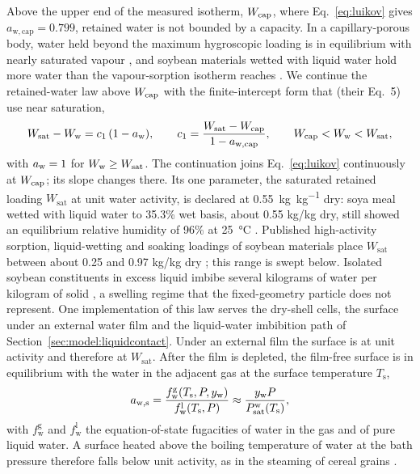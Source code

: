 Above the upper end of the measured isotherm, $W_{\mathrm{cap}}$, where
Eq.~\eqref{eq:luikov} gives $a_{\mathrm{w,cap}}=0.799$, retained water is
not bounded by a capacity. In a capillary-porous body, water held beyond
the maximum hygroscopic loading is in equilibrium with nearly saturated
vapour \citep{luikov1975systems,chen1989mathematical,schlunder2004drying,perre2023stateoftheart},
and soybean materials wetted with liquid water hold more water than the
vapour-sorption isotherm reaches
\citep{pixton1975moisture,urbanski1983flow,mukherjee2019soaking}. We
continue the retained-water law above $W_{\mathrm{cap}}$ with the finite-intercept
form that \citet{horrobin2003understanding} (their Eq.~5) use near
saturation,
\begin{equation}
W_{\mathrm{sat}}-W_{\mathrm{w}}=c_{1}\,(1-a_{\mathrm{w}}),
\qquad
c_{1}=\frac{W_{\mathrm{sat}}-W_{\mathrm{cap}}}{1-a_{\mathrm{w,cap}}},
\qquad W_{\mathrm{cap}}<W_{\mathrm{w}}<W_{\mathrm{sat}},
\label{eq:waterbridge}
\end{equation}
with $a_{\mathrm{w}}=1$ for $W_{\mathrm{w}}\ge W_{\mathrm{sat}}$. The
continuation joins Eq.~\eqref{eq:luikov} continuously at $W_{\mathrm{cap}}$; its slope
changes there. Its one parameter, the saturated retained loading
$W_{\mathrm{sat}}$ at unit water activity, is declared at
\SI{0.55}{\kilogram\per\kilogram} dry: soya meal wetted with liquid water
to 35.3\% wet basis, about 0.55 kg/kg dry, still showed an equilibrium
relative humidity of 96\% at \SI{25}{\celsius}
\citep[pp.~249 and~251]{pixton1975moisture}. Published high-activity
sorption, liquid-wetting and soaking loadings of soybean materials place
$W_{\mathrm{sat}}$ between about 0.25 and 0.97 kg/kg dry
\citep{aviara2004sorption,pixton1975moisture,mukherjee2019soaking};
this range is swept below. Isolated soybean constituents in excess liquid
imbibe several kilograms of water per kilogram of solid
\citep{urbanski1983flow}, a swelling regime that the fixed-geometry
particle does not represent.
One implementation of this law serves the dry-shell cells, the surface
under an external water film and the liquid-water imbibition path of
Section~\ref{sec:model:liquidcontact}. Under an external film the surface
is at unit activity and therefore at $W_{\mathrm{sat}}$. After the film is
depleted, the film-free surface is in equilibrium with the water in the
adjacent gas at the surface temperature $T_{\mathrm s}$,
\begin{equation}
a_{\mathrm{w,s}}
=\frac{f_{\mathrm{w}}^{\mathrm{g}}(T_{\mathrm s},P,y_{\mathrm{w}})}
      {f_{\mathrm{w}}^{\mathrm{l}}(T_{\mathrm s},P)}
\approx\frac{y_{\mathrm{w}} P}{P_{\mathrm{sat}}^{\mathrm{w}}(T_{\mathrm s})},
\label{eq:filmfreesurface}
\end{equation}
with $f_{\mathrm{w}}^{\mathrm{g}}$ and $f_{\mathrm{w}}^{\mathrm{l}}$ the
equation-of-state fugacities of water in the gas and of pure liquid water.
A surface heated above the boiling temperature of water at the bath
pressure therefore falls below unit activity, as in the steaming of cereal
grains \citep{stapley1999modelling,horrobin2003understanding}.

